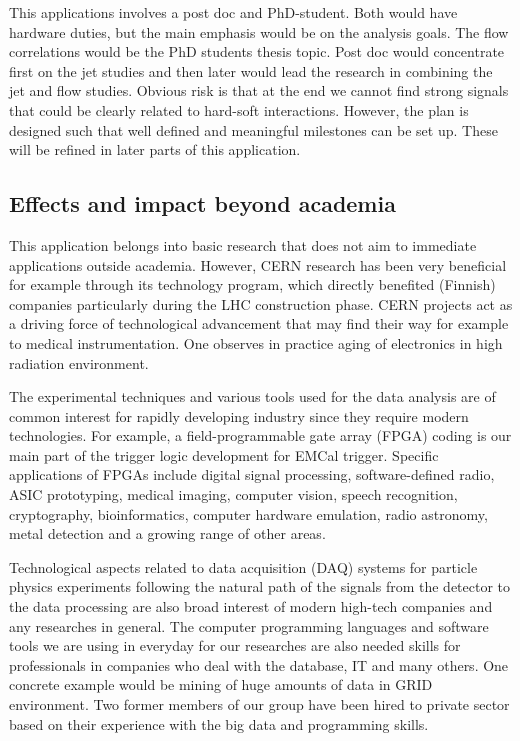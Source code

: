 This applications involves a post doc and PhD-student. Both would have hardware duties, but the main emphasis would be on the analysis goals. The flow correlations would be the PhD students thesis topic. Post doc would concentrate first on the jet studies and then later would lead the research in combining the jet and flow studies. Obvious risk is that at the end we cannot find strong signals that could be clearly related to hard-soft interactions. However, the plan is designed such that well defined and meaningful milestones can be set up. These will be refined in later parts of this application.

\subsection{Effects and impact beyond academia}

This application belongs into basic research that does not aim to immediate applications outside academia. However, CERN research has been very beneficial for example through its technology program, which directly benefited (Finnish) companies particularly during the LHC construction phase. CERN projects act as a driving force of technological advancement that may find their way for example to medical instrumentation. One observes in practice aging of electronics in high radiation environment.

The experimental techniques and various tools used for the data analysis are of common interest for rapidly developing industry since they require modern technologies. For example, a field-programmable gate array (FPGA) coding is our main part of the trigger logic development for EMCal trigger. Specific applications of FPGAs include digital signal processing, software-defined radio, ASIC prototyping, medical imaging, computer vision, speech recognition, cryptography, bioinformatics, computer hardware emulation, radio astronomy, metal detection and a growing range of other areas.

Technological aspects related to data acquisition (DAQ) systems for particle physics experiments following the natural path of the signals from the detector to the data processing are also broad interest of modern high-tech companies and any researches in general. The computer programming languages and software tools we are using in everyday for our researches are also needed skills for professionals in companies  who deal with the database, IT and many others. One concrete example would be mining of huge amounts of data in GRID environment. Two former members of our group have been hired to private sector based on their experience with the big data and programming skills.

